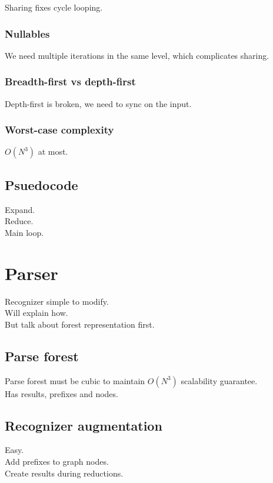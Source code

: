 \documentclass[a4paper,10pt]{article}
\begin{document}
Sharing fixes cycle looping.

\subsubsection{Nullables}

We need multiple iterations in the same level, which complicates sharing.

\subsubsection{Breadth-first vs depth-first}

Depth-first is broken, we need to sync on the input.

\subsubsection{Worst-case complexity}

$O(N^3)$ at most.

\subsection{Psuedocode}

Expand.\\
Reduce.\\
Main loop.

\section{Parser}

Recognizer simple to modify.\\
Will explain how.\\
But talk about forest representation first.

\subsection{Parse forest}

Parse forest must be cubic to maintain $O(N^3)$ scalability guarantee.\\
Has results, prefixes and nodes.

\subsection{Recognizer augmentation}

Easy.\\
Add prefixes to graph nodes.\\
Create results during reductions.
\end{document}
